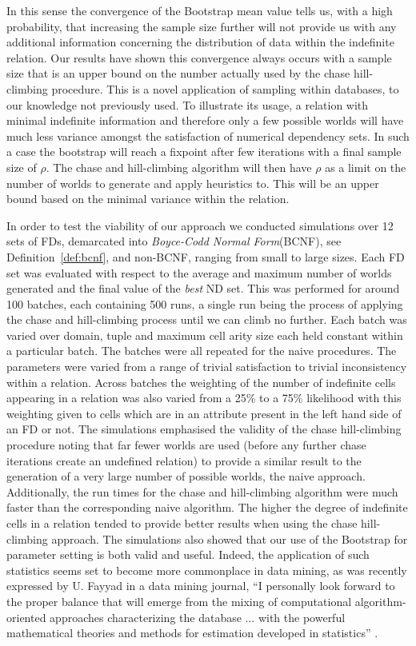In this sense the convergence of the Bootstrap mean value
tells us, with a high probability, that
increasing the sample size further will not provide us with any
additional information concerning the distribution of data within the
indefinite relation. Our 
results have shown this convergence always occurs with a sample size 
that is an upper bound on the 
number actually used by the chase hill-climbing procedure. This is a novel
application of sampling within databases, to our knowledge not
previously used. To illustrate its usage, a relation with 
minimal indefinite information and therefore only
a few possible worlds will have much less variance amongst the satisfaction
of numerical dependency sets. In such a case the bootstrap will reach
a fixpoint after few iterations with a final sample size of $\rho$. The
chase and hill-climbing algorithm will then have $\rho$ as a limit on
the number of worlds to generate and apply heuristics to. This will be
an upper bound based on the minimal variance within the relation.

\smallskip

In order to test the viability of our approach we conducted simulations
over 12 sets of FDs, demarcated into {\em Boyce-Codd Normal
Form}(BCNF), see Definition~\ref{def:bcnf}, 
and non-BCNF, ranging from small to large sizes. 
 Each FD set was evaluated with respect to the average and maximum number
of worlds generated and the final value of the {\em best} ND set.
This was performed for around 100 batches, each containing 500 runs, a
single run being the process of applying the 
chase and hill-climbing process until we can climb no further. 
Each batch was varied over domain, tuple
and maximum cell arity size each held constant within a
particular batch. The batches were all repeated for the naive procedures. The
parameters 
were varied from a range of trivial satisfaction to trivial inconsistency
within a relation. Across batches the weighting of the number of 
indefinite cells appearing in a relation was also varied from a 25\%
to a 75\% likelihood with this weighting given to cells which are
in an attribute present in the left hand side of an FD or not.
The simulations
emphasised the validity of the chase hill-climbing procedure noting that
far fewer worlds are used (before any further chase iterations create
an undefined relation) to provide a similar result to the generation of
a very large number of possible worlds, the naive
approach. Additionally, the run times for the chase and hill-climbing
algorithm were much faster than the corresponding naive algorithm. The higher
the degree of indefinite cells in a relation tended to provide better
results when using the chase hill-climbing approach.
 The simulations also showed that our
use of the Bootstrap for parameter setting is both valid and useful.
Indeed, the application of such statistics seems set to become more
commonplace in data mining, as was recently expressed by U. Fayyad in
a data mining journal, ``I personally look forward to the
proper balance that
will emerge from the mixing of computational algorithm-oriented
approaches characterizing the database ... with the powerful
mathematical theories and methods for estimation developed in statistics''
\cite{fay98}.

